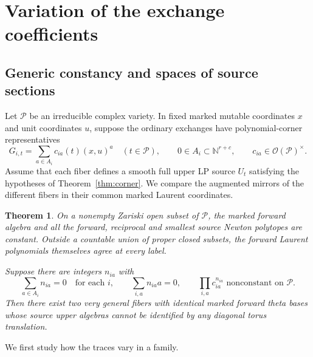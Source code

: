 \documentclass[11pt,reqno]{amsart}
\numberwithin{equation}{section}
\newtheorem{theorem}{Theorem}[section]
\theoremstyle{definition}
\theoremstyle{remark}
\begin{document}
\section{Variation of the exchange coefficients}
\label{sec:coefficient-variation}

\subsection{Generic constancy and spaces of source sections}

Let \(\mathcal P\) be an irreducible complex variety. In fixed marked mutable
coordinates \(x\) and unit coordinates \(u\), suppose the ordinary
exchanges have polynomial-corner representatives
\[ G_{i,t}=\sum_{a\in A_i} c_{ia}(t) (x,u)^a \quad(t\in \mathcal P),\qquad 0\in A_i\subset\mathbb N^{r+c}, \qquad c_{ia}\in\mathcal O(\mathcal P)^\times . \]
Assume that each fiber defines a smooth full upper LP source \(U_t\)
satisfying the hypotheses of Theorem~\ref{thm:corner}. We compare
the augmented mirrors of the different fibers in their common marked
Laurent coordinates.

\begin{theorem}\label{thm:generic-coefficient-obstruction}
On a nonempty Zariski open subset of \(\mathcal P\), the marked forward
algebra and all the forward, reciprocal and smallest source Newton
polytopes are constant. Outside a countable union of proper closed
subsets, the forward Laurent polynomials themselves agree at every label.

Suppose there are integers \(n_{ia}\) with
\[ \sum_{a\in A_i} n_{ia}=0\quad\text{for each }i, \qquad \sum_{i,a} n_{ia}a=0, \qquad \prod_{i,a} c_{ia}^{n_{ia}}\text{ nonconstant on }\mathcal P . \]
Then there exist two very general fibers with identical marked forward
theta bases whose source upper algebras cannot be identified by any
diagonal torus translation.
\end{theorem}

We first study how the traces vary in a family.
\end{document}
